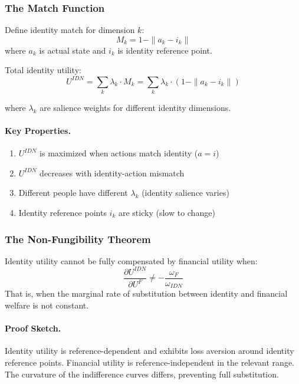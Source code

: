 \subsubsection{The Match Function}

Define identity match for dimension $k$:
\begin{equation}
M_k = 1 - \|a_k - i_k\|
\end{equation}
where $a_k$ is actual state and $i_k$ is identity reference point.

Total identity utility:
\begin{equation}
U^{IDN} = \sum_k \lambda_k \cdot M_k = \sum_k \lambda_k \cdot (1 - \|a_k - i_k\|)
\label{eq:identity-utility}
\end{equation}

where $\lambda_k$ are salience weights for different identity dimensions.

\paragraph{Key Properties.}
\begin{enumerate}
    \item $U^{IDN}$ is maximized when actions match identity ($a = i$)
    \item $U^{IDN}$ decreases with identity-action mismatch
    \item Different people have different $\lambda_k$ (identity salience varies)
    \item Identity reference points $i_k$ are sticky (slow to change)
\end{enumerate}

\subsubsection{The Non-Fungibility Theorem}

\begin{theorem}
Identity utility cannot be fully compensated by financial utility when:
\begin{equation}
\frac{\partial U^{IDN}}{\partial U^F} \neq -\frac{\omega_F}{\omega_{IDN}}
\end{equation}
That is, when the marginal rate of substitution between identity and 
financial welfare is not constant.
\end{theorem}

\paragraph{Proof Sketch.}
Identity utility is reference-dependent and exhibits loss aversion 
around identity reference points. Financial utility is reference-independent 
in the relevant range. The curvature of the indifference curves differs, 
preventing full substitution.

